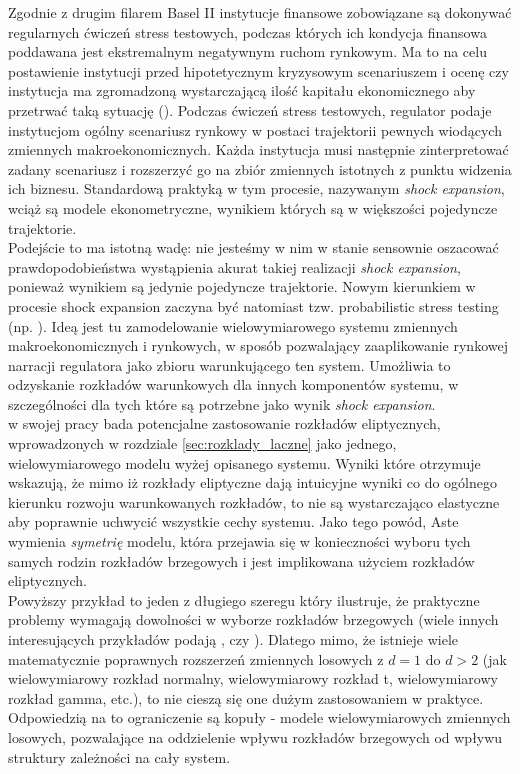Zgodnie z drugim filarem Basel II instytucje finansowe zobowiązane są dokonywać regularnych ćwiczeń stress testowych, podczas których ich kondycja finansowa poddawana jest ekstremalnym negatywnym ruchom rynkowym. Ma to na celu postawienie instytucji przed hipotetycznym kryzysowym scenariuszem i ocenę czy instytucja ma zgromadzoną wystarczającą ilość kapitału ekonomicznego aby przetrwać taką sytuację (\cite{BaselII}). Podczas ćwiczeń stress testowych, regulator podaje instytucjom ogólny scenariusz rynkowy w postaci trajektorii pewnych wiodących zmiennych makroekonomicznych. Każda instytucja musi następnie zinterpretować zadany scenariusz i rozszerzyć go na zbiór zmiennych istotnych z punktu widzenia ich biznesu. Standardową praktyką w tym procesie, nazywanym \emph{shock expansion}, wciąż są modele ekonometryczne, wynikiem których są w większości pojedyncze trajektorie. \cite{Siddique_Stress_testing}\\
Podejście to ma istotną wadę: nie jesteśmy w nim w stanie sensownie oszacować prawdopodobieństwa wystąpienia akurat takiej realizacji \emph{shock expansion}, ponieważ wynikiem są jedynie pojedyncze trajektorie. Nowym kierunkiem w procesie shock expansion zaczyna być natomiast tzw. probabilistic stress testing (np. \cite{Aste_Probabilistic_Stress_Testing}). Ideą jest tu zamodelowanie wielowymiarowego systemu zmiennych makroekonomicznych i rynkowych, w sposób pozwalający zaaplikowanie rynkowej narracji regulatora jako zbioru warunkującego ten system. Umożliwia to odzyskanie rozkładów warunkowych dla innych komponentów systemu, w szczególności dla tych które są potrzebne jako wynik \emph{shock expansion}.\\
\cite{Aste_Probabilistic_Stress_Testing} w swojej pracy bada potencjalne zastosowanie rozkładów eliptycznych, wprowadzonych w rozdziale \ref{sec:rozklady_laczne} jako jednego, wielowymiarowego modelu wyżej opisanego systemu. Wyniki które otrzymuje wskazują, że mimo iż rozkłady eliptyczne dają intuicyjne wyniki co do ogólnego kierunku rozwoju warunkowanych rozkładów, to nie są wystarczająco elastyczne aby poprawnie uchwycić wszystkie cechy systemu. Jako tego powód, Aste wymienia \textit{symetrię} modelu, która przejawia się w konieczności wyboru tych samych rodzin rozkładów brzegowych i jest implikowana użyciem rozkładów eliptycznych.\\

Powyższy przykład to jeden z długiego szeregu który ilustruje, że praktyczne problemy wymagają dowolności w wyborze rozkładów brzegowych (wiele innych interesujących przykładów podają \cite{Cherubini_Copula_Methods_in_Finance}, czy \cite{Cherubini_Dynamic_Copula_Methods_in_Finance}). Dlatego mimo, że istnieje wiele matematycznie poprawnych rozszerzeń zmiennych losowych z $d=1$ do $d>2$ (jak wielowymiarowy rozkład normalny, wielowymiarowy rozkład t, wielowymiarowy rozkład gamma, etc.), to nie cieszą się one dużym zastosowaniem w praktyce. Odpowiedzią na to ograniczenie są kopuły - modele wielowymiarowych zmiennych losowych, pozwalające na oddzielenie wpływu rozkładów brzegowych od wpływu struktury zależności na cały system.\\